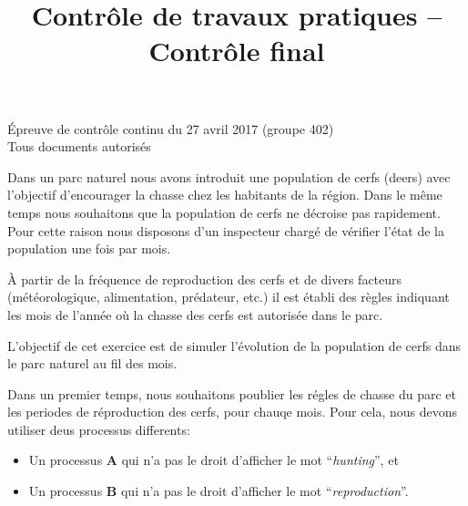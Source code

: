 \documentclass[CC,sansRappel,12pt]{tdtp-utf8}
\date{}
\title{Contrôle de travaux pratiques -- Contrôle final}
\newcommand{\tocorrect}[1]{\textcolor{dgreen}{#1}}
\begin{document}
\begin{feuille}

\hspace*{1mm} \hfill Épreuve de contrôle continu du 27 avril 2017 (groupe 402)\\
\hspace*{1mm} \hfill Tous documents autorisés\\[5mm]


\vspace{20pt}

Dans un parc naturel nous avons introduit une population de cerfs (deers) avec l'objectif d'encourager la chasse chez les habitants de la région. Dans le même temps nous souhaitons que la population de cerfs ne décroise pas rapidement. Pour cette raison nous disposons d'un inspecteur chargé de vérifier l'état de la population une fois par mois.

À partir de la fréquence de reproduction des cerfs et de divers facteurs (météorologique, alimentation, prédateur, etc.) il est établi des règles indiquant les mois de l'année où la chasse des cerfs est autorisée dans le parc.

L'objectif de cet exercice est de simuler l'évolution de la population de cerfs dans le parc naturel au fil des mois.

\begin{exercice}

\tocorrect{Dans un premier temps, nous souhaitons poublier les régles de chasse du parc et les periodes de réproduction des cerfs, pour chauqe mois. Pour cela, nous devons utiliser deus processus differents:}

\begin{itemize}
\item \tocorrect{Un processus \textbf{A} qui n'a pas le droit d'afficher le mot ``\textit{hunting}'', et}
\item \tocorrect{Un processus \textbf{B} qui n'a pas le droit d'afficher le mot ``\textit{reproduction}''.}
\end{itemize}


\end{exercice}
\end{feuille}
\end{document}
